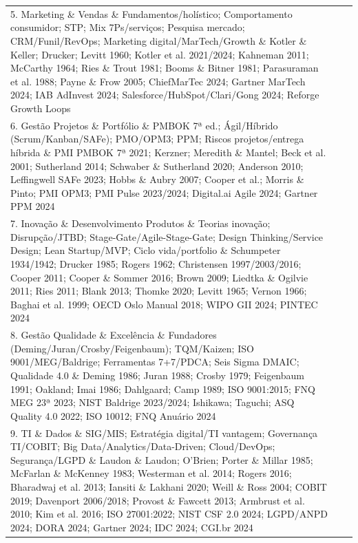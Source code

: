 \begin{longtable}{p{2.5cm}p{5.5cm}p{5.5cm}}
5. Marketing \& Vendas \&
Fundamentos/holístico; Comportamento consumidor; STP; Mix 7Ps/serviços; Pesquisa mercado; CRM/Funil/RevOps; Marketing digital/MarTech/Growth \&
Kotler \& Keller; Drucker; Levitt 1960; Kotler et al. 2021/2024; Kahneman 2011; McCarthy 1964; Ries \& Trout 1981; Booms \& Bitner 1981; Parasuraman et al. 1988; Payne \& Frow 2005; ChiefMarTec 2024; Gartner MarTech 2024; IAB AdInvest 2024; Salesforce/HubSpot/Clari/Gong 2024; Reforge Growth Loops \\

6. Gestão Projetos \& Portfólio \&
PMBOK 7ª ed.; Ágil/Híbrido (Scrum/Kanban/SAFe); PMO/OPM3; PPM; Riscos projetos/entrega híbrida \&
PMI PMBOK 7ª 2021; Kerzner; Meredith \& Mantel; Beck et al. 2001; Sutherland 2014; Schwaber \& Sutherland 2020; Anderson 2010; Leffingwell SAFe 2023; Hobbs \& Aubry 2007; Cooper et al.; Morris \& Pinto; PMI OPM3; PMI Pulse 2023/2024; Digital.ai Agile 2024; Gartner PPM 2024 \\

7. Inovação \& Desenvolvimento Produtos \&
Teorias inovação; Disrupção/JTBD; Stage-Gate/Agile-Stage-Gate; Design Thinking/Service Design; Lean Startup/MVP; Ciclo vida/portfolio \&
Schumpeter 1934/1942; Drucker 1985; Rogers 1962; Christensen 1997/2003/2016; Cooper 2011; Cooper \& Sommer 2016; Brown 2009; Liedtka \& Ogilvie 2011; Ries 2011; Blank 2013; Thomke 2020; Levitt 1965; Vernon 1966; Baghai et al. 1999; OECD Oslo Manual 2018; WIPO GII 2024; PINTEC 2024 \\

8. Gestão Qualidade \& Excelência \&
Fundadores (Deming/Juran/Crosby/Feigenbaum); TQM/Kaizen; ISO 9001/MEG/Baldrige; Ferramentas 7+7/PDCA; Seis Sigma DMAIC; Qualidade 4.0 \&
Deming 1986; Juran 1988; Crosby 1979; Feigenbaum 1991; Oakland; Imai 1986; Dahlgaard; Camp 1989; ISO 9001:2015; FNQ MEG 23ª 2023; NIST Baldrige 2023/2024; Ishikawa; Taguchi; ASQ Quality 4.0 2022; ISO 10012; FNQ Anuário 2024 \\

9. TI \& Dados \&
SIG/MIS; Estratégia digital/TI vantagem; Governança TI/COBIT; Big Data/Analytics/Data-Driven; Cloud/DevOps; Segurança/LGPD \&
Laudon \& Laudon; O'Brien; Porter \& Millar 1985; McFarlan \& McKenney 1983; Westerman et al. 2014; Rogers 2016; Bharadwaj et al. 2013; Iansiti \& Lakhani 2020; Weill \& Ross 2004; COBIT 2019; Davenport 2006/2018; Provost \& Fawcett 2013; Armbrust et al. 2010; Kim et al. 2016; ISO 27001:2022; NIST CSF 2.0 2024; LGPD/ANPD 2024; DORA 2024; Gartner 2024; IDC 2024; CGI.br 2024 \\


\end{longtable}
